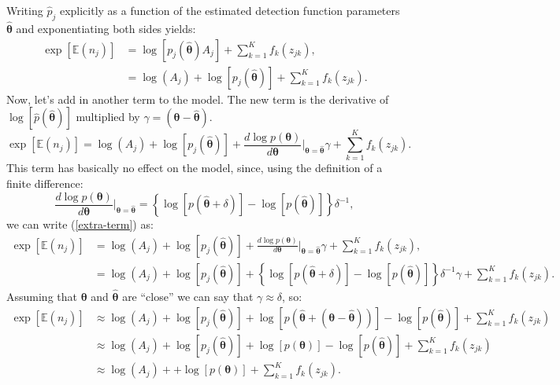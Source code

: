 \documentclass[11pt]{amsart}
\begin{document}
Writing $\hat{p}_j$ explicitly as a function of the estimated detection function parameters $\bm{\hat{\theta}}$ and exponentiating both sides yields:
\begin{align*}
\exp\left[ \mathbb{E}(n_j) \right] &= \log\left[p_j(\bm{\hat{\theta}})A_j\right] + \sum_{k=1}^K f_k(z_{jk}), \\
&= \log\left(A_j\right) + \log\left[p_j(\bm{\hat{\theta}})\right] + \sum_{k=1}^K f_k(z_{jk}).
\end{align*}
Now, let's add in another term to the model. The new term is the derivative of $\log\left[ \hat{p}(\bm{\hat{\theta}})\right]$ multiplied by $\gamma =(\bm{\theta} - \bm{\hat{\theta}})$.
\begin{equation}
\exp\left[ \mathbb{E}(n_j) \right] = \log\left(A_j\right) + \log\left[p_j(\bm{\hat{\theta}})\right] + \frac{ d \log p(\bm{\theta})}{d\bm{\theta}} \Big\vert_{\bm{\theta} = \hat{\bm{\theta}}} \gamma + \sum_{k=1}^K f_k(z_{jk}).
\label{extra-term}
\end{equation}
This term has basically no effect on the model, since, using the definition of a finite difference:
\begin{equation*}
\frac{ d \log p(\bm{\theta})}{d\bm{\theta}} \Big\vert_{\bm{\theta} = \hat{\bm{\theta}}} = \left\{\log\left[p(\hat{\bm{\theta}} + \delta)\right] - \log\left[p(\hat{\bm{\theta}})\right]\right\}\delta^{-1},
\end{equation*}
we can write (\ref{extra-term}) as:
\begin{align*}
\exp\left[ \mathbb{E}(n_j) \right] &= \log\left(A_j\right) + \log\left[p_j(\bm{\hat{\theta}})\right] + \frac{ d \log p(\bm{\theta})}{d\bm{\theta}} \Big\vert_{\bm{\theta} = \hat{\bm{\theta}}} \gamma + \sum_{k=1}^K f_k(z_{jk}),\\
&= \log\left(A_j\right) + \log\left[p_j(\bm{\hat{\theta}})\right] + \left\{\log\left[p(\hat{\bm{\theta}} + \delta)\right] - \log\left[p(\hat{\bm{\theta}})\right]\right\}\delta^{-1} \gamma + \sum_{k=1}^K f_k(z_{jk}).
\end{align*}
Assuming that $\bm{\theta}$ and $\bm{\hat{\theta}}$ are ``close'' we can say that $\gamma \approx \delta$, so:
\begin{align*}
\exp\left[ \mathbb{E}(n_j) \right] &\approx \log\left(A_j\right) + \log\left[p_j(\bm{\hat{\theta}})\right] + \log\left[p(\hat{\bm{\theta}} + (\bm{\theta} - \bm{\hat{\theta}}))\right] - \log\left[p(\hat{\bm{\theta}})\right] + \sum_{k=1}^K f_k(z_{jk})\\
&\approx \log\left(A_j\right) + \log\left[p_j(\bm{\hat{\theta}})\right] + \log\left[p(\bm{\theta})\right] - \log\left[p(\hat{\bm{\theta}})\right] + \sum_{k=1}^K f_k(z_{jk})\\
&\approx \log\left(A_j\right) + + \log\left[p(\bm{\theta})\right] + \sum_{k=1}^K f_k(z_{jk}).
\end{align*}
\end{document}
